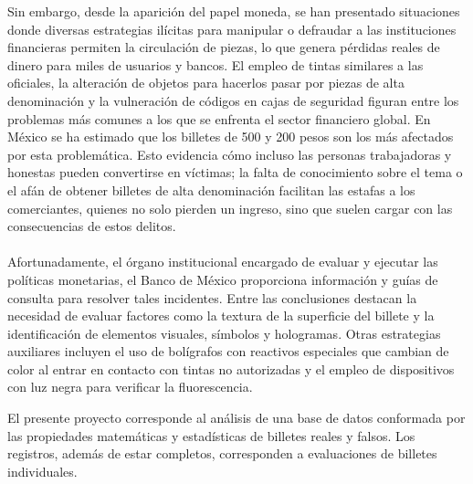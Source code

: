 \documentclass[conference]{IEEEtran}
\begin{document}
	Sin embargo, desde la aparición del papel moneda, se han presentado situaciones donde diversas estrategias ilícitas para manipular o defraudar a las instituciones financieras permiten la circulación de piezas, lo que genera pérdidas reales de dinero para miles de usuarios y bancos. El empleo de tintas similares a las oficiales, la alteración de objetos para hacerlos pasar por piezas de alta denominación y la vulneración de códigos en cajas de seguridad figuran entre los problemas más comunes a los que se enfrenta el sector financiero global.
	En México se ha estimado que los billetes de 500 y 200 pesos son los más afectados por esta problemática. Esto evidencia cómo incluso las personas trabajadoras y honestas pueden convertirse en víctimas; la falta de conocimiento sobre el tema o el afán de obtener billetes de alta denominación facilitan las estafas a los comerciantes, quienes no solo pierden un ingreso, sino que suelen cargar con las consecuencias de estos delitos.
	\\\\
	Afortunadamente, el órgano institucional encargado de evaluar y ejecutar las políticas monetarias, el Banco de México proporciona información y guías de consulta para resolver tales incidentes. Entre las conclusiones destacan la necesidad de evaluar factores como la textura de la superficie del billete y la identificación de elementos visuales, símbolos y hologramas. Otras estrategias auxiliares incluyen el uso de bolígrafos con reactivos especiales que cambian de color al entrar en contacto con tintas no autorizadas y el empleo de dispositivos con luz negra para verificar la fluorescencia.
	
	El presente proyecto corresponde al análisis de una base de datos conformada por las propiedades matemáticas y estadísticas de billetes reales y falsos. Los registros, además de estar completos, corresponden a evaluaciones de billetes individuales.\\
	
\end{document}
